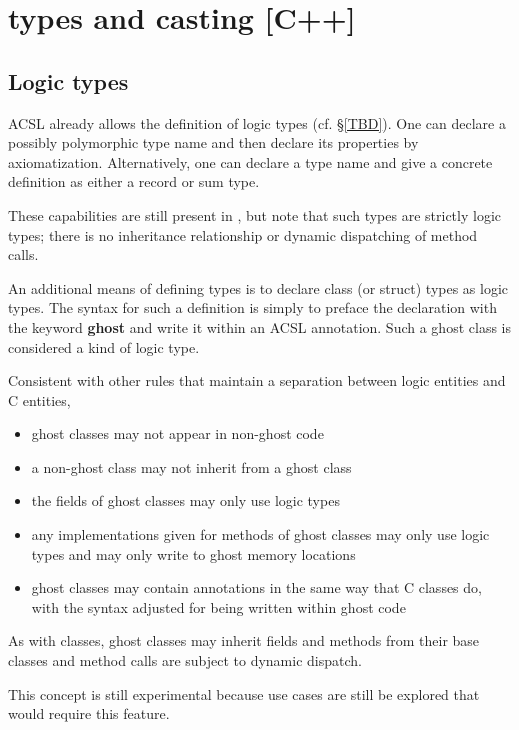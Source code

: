 \section{\lang{} types and casting [C++]}
\label{sec:types}

\subsection{Logic types}

ACSL already allows the definition of logic types (cf. \S\ref{TBD}). One can  declare a possibly polymorphic type name and then declare its properties by axiomatization. Alternatively, one can declare 
a type name and give a concrete definition as either a record or sum type.

These capabilities are still present in \NAME{}, but note that such types are strictly logic types; there is no inheritance relationship or dynamic dispatching of method calls.

\experimental

An additional means of defining types is to declare
\lang{} class (or struct) types as logic types. The syntax for such a definition is simply to preface the declaration
with the keyword \textbf{ghost} and write it within an ACSL annotation. Such a ghost class is considered a kind of logic type.

Consistent with other rules that maintain a separation between logic entities and C entities,
\begin{itemize}
	\item ghost classes may not appear in non-ghost code
	\item a non-ghost class may not inherit from a ghost class
	\item the fields of ghost classes may only use logic types
	\item any implementations given for methods of ghost classes may only use logic types and may only write to ghost memory locations
	\item ghost classes may contain \NAME{} annotations in the same way that C classes do, with the syntax adjusted for being written within ghost code
\end{itemize}

As with \lang{} classes, ghost classes may inherit fields and methods from their base classes and method calls are subject to dynamic dispatch.

This concept is still experimental because use cases are still be explored that would require this feature.

